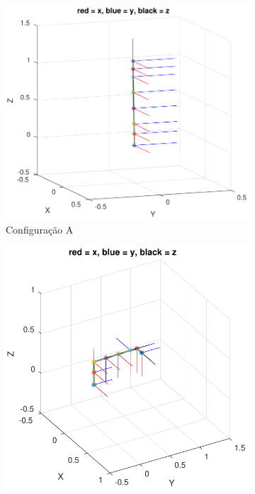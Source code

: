 \documentclass[a4paper,11pt]{article}
\theoremstyle{mytheor}
\begin{document}
\begin{figure}[!ht]
\centering
  \begin{minipage}{\linewidth}
  \centering
    \begin{subfigure}[b]{0.45\textwidth}
    \includegraphics[width=1\textwidth]{figs/ex1_a.pdf}
    \caption{Configuração A}
    \end{subfigure}
    \begin{subfigure}[b]{0.45\textwidth}
    \includegraphics[width=1\textwidth]{figs/ex1_b.pdf}

\end{subfigure}
\end{minipage}
\end{figure}
\end{document}
